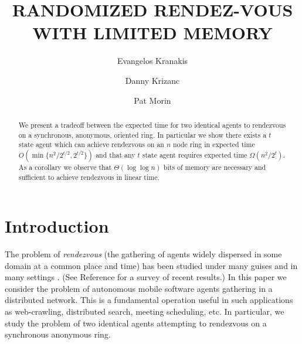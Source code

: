 \documentclass[lotsofwhite]{patmorin}
\title{\MakeUppercase{Randomized Rendez-Vous with Limited Memory}}
\author{Evangelos Kranakis \and
	Danny Krizanc \and
	Pat Morin}
\begin{document}
\maketitle
\begin{abstract}
We present a tradeoff between the expected time for two identical
agents to rendezvous on a synchronous, anonymous, oriented
ring. In particular we show 
there exists a $t$ state agent which
can achieve rendezvous on an $n$ node ring in expected time
$O(\min \{ n^2/2^{t/2}, 2^{t/2}\} )$ and that any $t$ state agent
requires expected time $\Omega( n^2/2^t )$. 
As a corollary we observe that $\Theta(\log \log n)$ bits of
memory are necessary and 
sufficient to achieve rendezvous in linear time. 
\end{abstract}

\section{Introduction}

The problem of {\em rendezvous} (the gathering of agents widely
dispersed in some domain at a common place and time) has been studied
under many guises and in many settings
\cite{alpernGal03,Marco,dessmark,dobrev,fkkss,fkklss,gakra,kowalski1,
kowalski2,kkss,markou,RoyDudek,sawchuk04,Yamashita,yu}.  (See
Reference \cite{kkr} for a survey of recent results.) In this paper we
consider the problem of autonomous mobile software agents gathering in
a distributed network. This is a fundamental operation useful in such
applications as web-crawling, distributed search, meeting scheduling,
etc. In particular, we study the problem of two identical agents
attempting to rendezvous on a synchronous anonymous ring.
\end{document}
